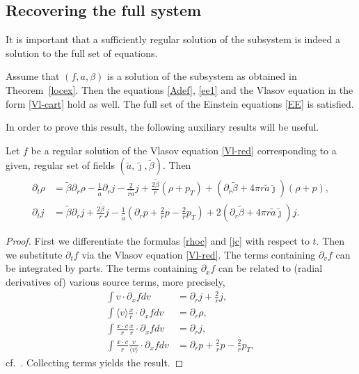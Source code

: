 \documentclass[11pt]{article}
\def\p0{\langle v \rangle}
\begin{document}
\subsection{Recovering the full system}
%
It is important that a sufficiently regular solution of the subsystem
is indeed a solution to the full set of equations.
%
%
\begin{proposition}\label{fullsystem}
  Assume that $(f,a,\beta)$ is a solution of the subsystem as obtained in
  Theorem~\ref{locex}. Then the equations \eqref{Adef}, \eqref{ee1}
  and the Vlasov equation in the form \eqref{Vl-cart} hold as well.
  The full set of the Einstein equations \eqref{EE} is satisfied.
\end{proposition}
%
%
In order to prove this result, the following auxiliary results will be useful.
%
%
\begin{lemma}\label{dtrhodtj}
  Let $f$ be a regular solution of the Vlasov equation \eqref{Vl-red}
  corresponding to a given, regular set of fields
  $(\tilde a,\tilde \jmath,\tilde \beta)$. Then
  \begin{align*}
    \partial_t \rho
    &=
    \tilde \beta \partial_r \rho
    -\frac{1}{\tilde a} \partial_r j - \frac{2}{r \tilde a} j
    +
    \frac{2 \tilde \beta}{r}(\rho + p_T)
    +
    \left(\partial_r \tilde \beta +4\pi r \tilde a \tilde\jmath\right)
    (\rho + p), \\
    \partial_t j
    &=
    \tilde \beta \partial_r j + \frac{2\tilde \beta}{r} j
    -\frac{1}{\tilde a}
    \left(\partial_r p + \frac{2}{r} p - \frac{2}{r} p_T\right)
    +
    2 \left(\partial_r \tilde \beta +4\pi r \tilde a \tilde\jmath\right) j .
  \end{align*}
\end{lemma}
%
\begin{proof}
  First we differentiate the formulas \eqref{rhoc} and \eqref{jc} with respect
  to $t$. Then we substitute $\partial_t f$ via the Vlasov equation
  \eqref{Vl-red}. The terms containing $\partial_v f$ can be integrated
  by parts. The terms containing $\partial_x f$ can be related to
  (radial derivatives of) various source terms,
  more precisely,
  \begin{align*}
    \int v \cdot \partial_x f dv
    &=
    \partial_r j + \frac{2}{r} j,\\ 
    \int \p0 \frac{x}{r} \cdot \partial_x f dv
    &=
    \partial_r \rho,\\
    \int \frac{x\cdot v}{r} \frac{x}{r}\cdot \partial_x f dv
    &=
    \partial_r j,\\
    \int \frac{x\cdot v}{r} \frac{v}{\p0}\cdot \partial_x f dv
    &=
    \partial_r p + \frac{2}{r} p - \frac{2}{r} p_T,
  \end{align*}
   cf.~\cite[Lemma 6.6, Lemma 6.8]{GB}. Collecting terms yields the result.
\end{proof}
  
\end{document}
